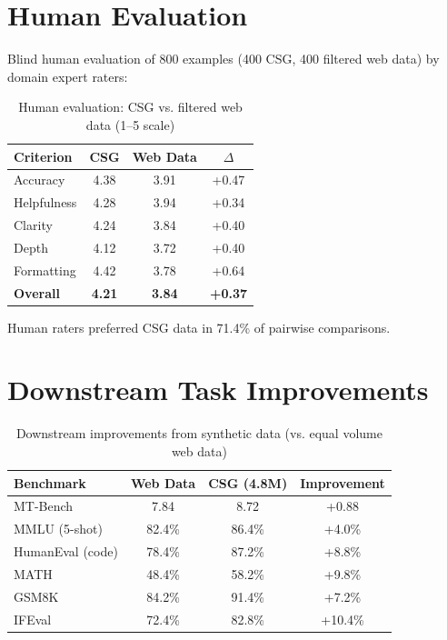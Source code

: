 \documentclass[11pt,a4paper]{article}
\begin{document}
\section{Human Evaluation}

Blind human evaluation of 800 examples (400 CSG, 400 filtered web data) by domain expert raters:

\begin{table}[H]
\centering
\caption{Human evaluation: CSG vs. filtered web data (1--5 scale)}
\label{tab:human_eval}
\begin{tabular}{lccc}
\toprule
Criterion & CSG & Web Data & $\Delta$ \\
\midrule
Accuracy & 4.38 & 3.91 & +0.47 \\
Helpfulness & 4.28 & 3.94 & +0.34 \\
Clarity & 4.24 & 3.84 & +0.40 \\
Depth & 4.12 & 3.72 & +0.40 \\
Formatting & 4.42 & 3.78 & +0.64 \\
\midrule
\textbf{Overall} & \textbf{4.21} & \textbf{3.84} & \textbf{+0.37} \\
\bottomrule
\end{tabular}
\end{table}

Human raters preferred CSG data in 71.4\% of pairwise comparisons.

\section{Downstream Task Improvements}

\begin{table}[H]
\centering
\caption{Downstream improvements from synthetic data (vs. equal volume web data)}
\label{tab:downstream}
\begin{tabular}{lccc}
\toprule
Benchmark & Web Data & CSG (4.8M) & Improvement \\
\midrule
MT-Bench & 7.84 & 8.72 & +0.88 \\
MMLU (5-shot) & 82.4\% & 86.4\% & +4.0\% \\
HumanEval (code) & 78.4\% & 87.2\% & +8.8\% \\
MATH & 48.4\% & 58.2\% & +9.8\% \\
GSM8K & 84.2\% & 91.4\% & +7.2\% \\
IFEval & 72.4\% & 82.8\% & +10.4\% \\
\bottomrule
\end{tabular}
\end{table}
\end{document}
